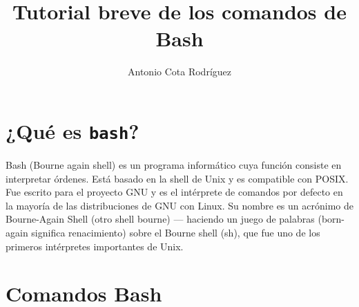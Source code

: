 \documentclass[12pt]{article}
\title{Tutorial breve de los comandos de Bash}
\author{Antonio Cota Rodr\'iguez}
\date{}
\begin{document}
\maketitle

\section{¿Qué es {\tt bash}?}
Bash (Bourne again shell) es un programa inform\'atico cuya funci\'on consiste en interpretar \'ordenes. Est\'a basado en la shell de Unix y es compatible con POSIX.
Fue escrito para el proyecto GNU y es el int\'erprete de comandos por defecto en la mayor\'ia de las distribuciones de GNU con Linux. Su nombre es un acr\'onimo de Bourne-Again Shell (otro shell bourne) — haciendo un juego de palabras (born-again significa renacimiento) sobre el Bourne shell (sh), que fue uno de los primeros int\'erpretes importantes de Unix.

\section{Comandos Bash}
\end{document}
